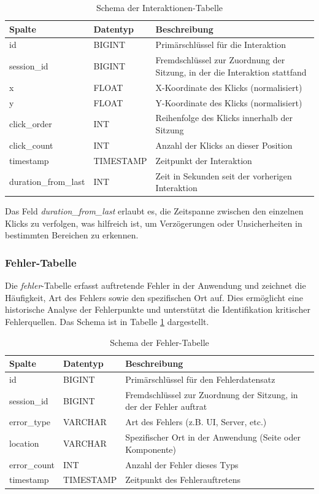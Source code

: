 \documentclass[12pt,oneside]{article}
\begin{document}
\begin{table}[H]
\centering
\caption{Schema der Interaktionen-Tabelle}
\begin{tabular}{|l|l|p{10cm}|}
\hline
\textbf{Spalte} & \textbf{Datentyp} & \textbf{Beschreibung} \\ \hline
id & BIGINT & Primärschlüssel für die Interaktion \\ \hline
session\_id & BIGINT & Fremdschlüssel zur Zuordnung der Sitzung, in der die Interaktion stattfand \\ \hline
x & FLOAT & X-Koordinate des Klicks (normalisiert) \\ \hline
y & FLOAT & Y-Koordinate des Klicks (normalisiert) \\ \hline
click\_order & INT & Reihenfolge des Klicks innerhalb der Sitzung \\ \hline
click\_count & INT & Anzahl der Klicks an dieser Position \\ \hline
timestamp & TIMESTAMP & Zeitpunkt der Interaktion \\ \hline
duration\_from\_last & INT & Zeit in Sekunden seit der vorherigen Interaktion \\ \hline
\end{tabular}
\end{table}

Das Feld \textit{duration\_from\_last} erlaubt es, die Zeitspanne zwischen den einzelnen Klicks zu verfolgen, was hilfreich ist, um Verzögerungen oder Unsicherheiten in bestimmten Bereichen zu erkennen.

\subsubsection{Fehler-Tabelle}
Die \textit{fehler}-Tabelle erfasst auftretende Fehler in der Anwendung und zeichnet die Häufigkeit, Art des Fehlers sowie den spezifischen Ort auf. Dies ermöglicht eine historische Analyse der Fehlerpunkte und unterstützt die Identifikation kritischer Fehlerquellen. Das Schema ist in Tabelle \ref{tab:errors_table} dargestellt.

\begin{table}[H]
\centering
\caption{Schema der Fehler-Tabelle}
\label{tab:errors_table}
\begin{tabular}{|l|l|p{10cm}|}
\hline
\textbf{Spalte} & \textbf{Datentyp} & \textbf{Beschreibung} \\ \hline
id & BIGINT & Primärschlüssel für den Fehlerdatensatz \\ \hline
session\_id & BIGINT & Fremdschlüssel zur Zuordnung der Sitzung, in der der Fehler auftrat \\ \hline
error\_type & VARCHAR & Art des Fehlers (z.B. UI, Server, etc.) \\ \hline
location & VARCHAR & Spezifischer Ort in der Anwendung (Seite oder Komponente) \\ \hline
error\_count & INT & Anzahl der Fehler dieses Typs \\ \hline
timestamp & TIMESTAMP & Zeitpunkt des Fehlerauftretens \\ \hline
\end{tabular}
\end{table}
\end{document}
